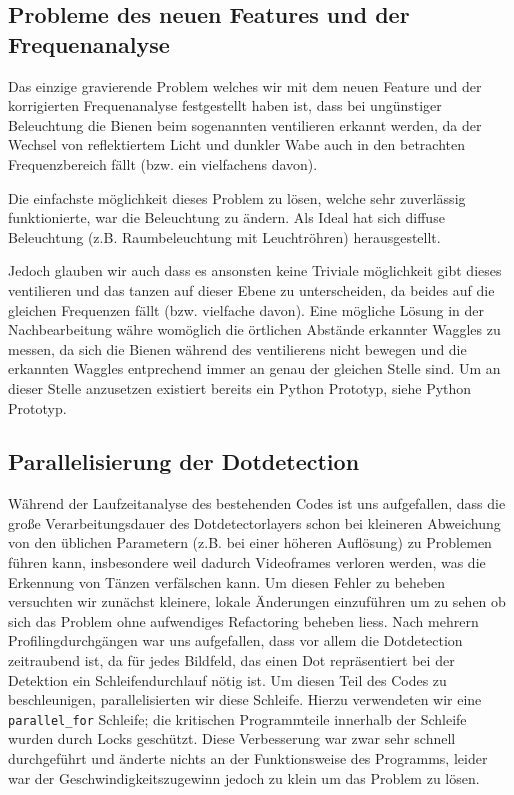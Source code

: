 \documentclass[11pt,a4paper]{article}
\begin{document}
\subsection{Probleme des neuen Features und der Frequenanalyse}
Das einzige gravierende Problem welches wir mit dem neuen Feature und der korrigierten Frequenanalyse festgestellt haben ist, dass bei ungünstiger Beleuchtung die Bienen beim sogenannten ventilieren erkannt werden, da der Wechsel von reflektiertem Licht und dunkler Wabe auch in den betrachten Frequenzbereich fällt (bzw. ein vielfachens davon).

Die einfachste möglichkeit dieses Problem zu lösen, welche sehr zuverlässig funktionierte, war die Beleuchtung zu ändern. Als Ideal hat sich diffuse Beleuchtung (z.B. Raumbeleuchtung mit Leuchtröhren) herausgestellt.

Jedoch glauben wir auch dass es ansonsten keine Triviale möglichkeit gibt dieses ventilieren und das tanzen auf dieser Ebene zu unterscheiden, da beides auf die gleichen Frequenzen fällt (bzw. vielfache davon). Eine mögliche Lösung in der Nachbearbeitung währe womöglich die örtlichen Abstände erkannter Waggles zu messen, da sich die Bienen während des ventilierens nicht bewegen und die erkannten Waggles entprechend immer an genau der gleichen Stelle sind. Um an dieser Stelle anzusetzen existiert bereits ein Python Prototyp, siehe Python Prototyp.

\subsection{Parallelisierung der Dotdetection}%

Während der Laufzeitanalyse des bestehenden Codes ist uns aufgefallen, dass die große Verarbeitungsdauer des Dotdetectorlayers schon bei kleineren Abweichung von den üblichen Parametern (z.B. bei einer höheren Auflösung)
zu Problemen führen kann, insbesondere weil dadurch Videoframes verloren werden, was die Erkennung von Tänzen verfälschen kann.
Um diesen Fehler zu beheben versuchten wir zunächst kleinere, lokale Änderungen einzuführen um zu sehen ob sich das Problem ohne aufwendiges Refactoring beheben liess.
Nach mehrern Profilingdurchgängen war uns aufgefallen, dass vor allem die Dotdetection zeitraubend ist, da für jedes Bildfeld, das einen Dot repräsentiert bei der Detektion ein Schleifendurchlauf nötig ist.
Um diesen Teil des Codes zu beschleunigen, parallelisierten wir diese Schleife.
Hierzu verwendeten wir eine {\tt parallel\_for} Schleife; die kritischen Programmteile innerhalb der Schleife wurden durch Locks geschützt.
Diese Verbesserung war zwar sehr schnell durchgeführt und änderte nichts an der Funktionsweise des Programms, leider war der Geschwindigkeitszugewinn jedoch zu klein um das Problem zu lösen.
\end{document}
